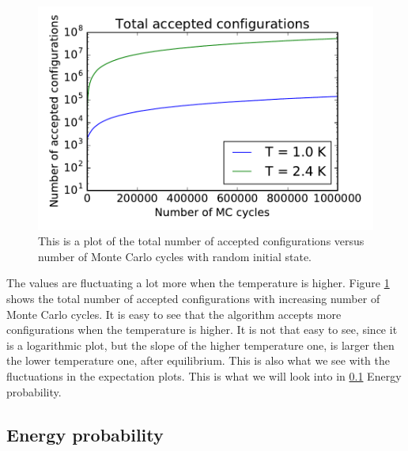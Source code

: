 \begin{figure}[H]
\includegraphics[width=\linewidth]{../results/4c/L_20_total_accepted}\caption{This is a plot of the total number of accepted configurations versus number of Monte Carlo cycles with random initial state.}\label{fig:total_accepted}
\end{figure}

The values are fluctuating a lot more when the temperature is higher. Figure \ref{fig:total_accepted} shows the total number of accepted configurations with increasing number of Monte Carlo cycles. It is easy to see that the algorithm accepts more configurations when the temperature is higher. It is not that easy to see, since it is a logarithmic plot, but the slope of the higher temperature one, is larger then the lower temperature one, after equilibrium. This is also what we see with the fluctuations in the expectation plots. This is what we will look into in \ref{sec:probability} Energy probability.



\subsection{Energy probability}\label{sec:probability}

